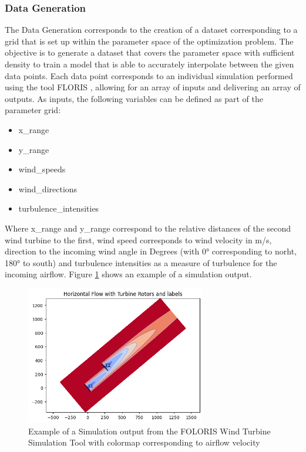 \subsubsection{Data Generation}

The Data Generation corresponds to the creation of a dataset corresponding to a grid that is set up within the parameter space of the optimization problem. The objective is to generate a dataset that covers the parameter space with sufficient density to train a model that is able to accurately interpolate between the given data points. Each data point corresponds to an individual simulation performed using the tool FLORIS \cite{nrel_floris_web}, allowing for an array of inputs and delivering an array of outputs. As inputs, the following variables can be defined as part of the parameter grid:

\begin{itemize}
	\item x\_range
	\item y\_range
	\item wind\_speeds
	\item wind\_directions
	\item turbulence\_intensities
\end{itemize}

Where x\_range and y\_range correspond to the relative distances of the second wind turbine to the first, wind speed corresponds to wind velocity in m/s,  direction to the incoming wind angle in Degrees (with 0° corresponding to norht, 180° to south) and turbulence intensities as a measure of turbulence for the incoming airflow. Figure \ref{fig:Floris} shows an example of a simulation output. 


\begin{figure}[h] 
	\centering
	\includegraphics[width=0.7\textwidth]{../figures/modelling/Floris.png} 
	\caption{Example of a Simulation output from the FOLORIS Wind Turbine Simulation Tool \cite{nrel_floris} with colormap corresponding to airflow velocity}
	\label{fig:Floris}
\end{figure}

